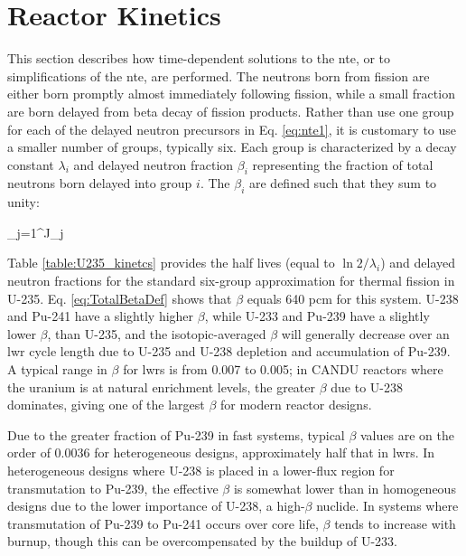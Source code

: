 \section{Reactor Kinetics}
\label{sec:Kinetics}

This section describes how time-dependent solutions to the \gls{nte}, or to simplifications of the \gls{nte}, are performed. The neutrons born from fission are either born promptly almost immediately following fission, while a small fraction are born delayed from beta decay of fission products. Rather than use one group for each of the delayed neutron precursors in Eq. \eqref{eq:nte1}, it is customary to use a smaller number of groups, typically six. Each group is characterized by a decay constant \(\lambda_i\) and delayed neutron fraction \(\beta_i\) representing the fraction of total neutrons born delayed into group \(i\). The \(\beta_i\) are defined such that they sum to unity:

\beq
\label{eq:TotalBetaDef}
\beta\equiv\sum_{j=1}^J\beta_j
\eeq

Table \ref{table:U235_kinetcs} provides the half lives (equal to \(\ln{2}/\lambda_i\)) and delayed neutron fractions for the standard six-group approximation for thermal fission in U-235. Eq. \eqref{eq:TotalBetaDef} shows that \(\beta\) equals 640 pcm for this system. U-238 and Pu-241 have a slightly higher \(\beta\), while U-233 and Pu-239 have a slightly lower \(\beta\), than U-235, and the isotopic-averaged \(\beta\) will generally decrease over an \gls{lwr} cycle length due to U-235 and U-238 depletion and accumulation of Pu-239. A typical range in \(\beta\) for \glspl{lwr} is from 0.007 to 0.005; in CANDU reactors where the uranium is at natural enrichment levels, the greater \(\beta\) due to U-238 dominates, giving one of the largest \(\beta\) for modern reactor designs.

Due to the greater fraction of Pu-239 in fast systems, typical \(\beta\) values are on the order of 0.0036 for heterogeneous designs, approximately half that in \glspl{lwr}. In heterogeneous designs where U-238 is placed in a lower-flux region for transmutation to Pu-239, the effective \(\beta\) is somewhat lower than in homogeneous designs due to the lower importance of U-238, a high-\(\beta\) nuclide. In systems where transmutation of Pu-239 to Pu-241 occurs over core life, \(\beta\) tends to increase with burnup, though this can be overcompensated by the buildup of U-233.

